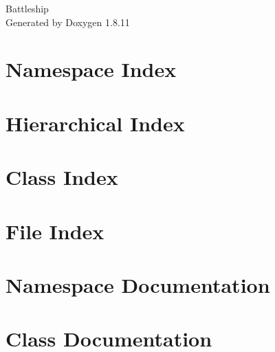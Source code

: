\documentclass[twoside]{book}
\newcommand{\+}{\discretionary{\mbox{\scriptsize$\hookleftarrow$}}{}{}}
\newcommand{\clearemptydoublepage}{%
  \newpage{\pagestyle{empty}\cleardoublepage}%
}
\begin{document}
\hypersetup{pageanchor=false,
             bookmarksnumbered=true,
             pdfencoding=unicode
            }
\begin{titlepage}
\vspace*{7cm}
\begin{center}%
{\Large Battleship }\\
\vspace*{1cm}
{\large Generated by Doxygen 1.8.11}\\
\end{center}
\end{titlepage}
\clearemptydoublepage
\tableofcontents
\clearemptydoublepage
{}
\hypersetup{pageanchor=true}

\chapter{Namespace Index}

\chapter{Hierarchical Index}

\chapter{Class Index}

\chapter{File Index}

\chapter{Namespace Documentation}


\chapter{Class Documentation}





























\end{document}
